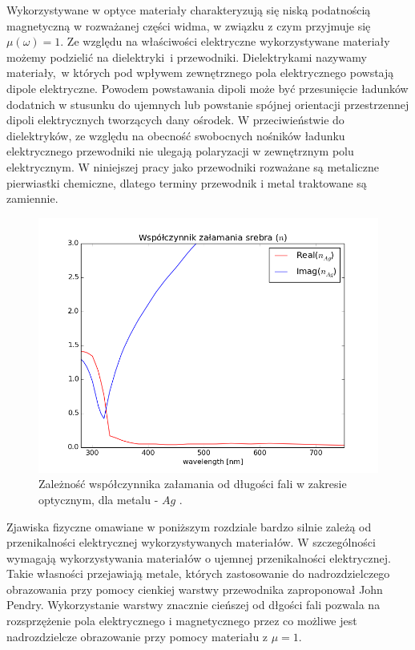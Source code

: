 Wykorzystywane w optyce materiały charakteryzują się niską podatnością magnetyczną w rozważanej części widma, w związku z czym przyjmuje się $\mu(\omega)=1$. Ze względu na właściwości elektryczne wykorzystywane materiały możemy  podzielić na dielektryki~i przewodniki. Dielektrykami nazywamy materiały,~w których pod wpływem zewnętrznego pola elektrycznego powstają dipole elektryczne. Powodem powstawania dipoli może być przesunięcie ładunków dodatnich w stusunku do ujemnych lub powstanie spójnej orientacji przestrzennej dipoli elektrycznych tworzących dany ośrodek. W przeciwieństwie do dielektryków, ze względu na obecność swobocnych nośników ładunku elektrycznego przewodniki nie ulegają polaryzacji w zewnętrznym polu elektrycznym. W niniejszej pracy jako przewodniki rozważane są metaliczne pierwiastki chemiczne, dlatego terminy przewodnik i metal traktowane są zamiennie.

\begin{figure}[tb]
	\includegraphics[width=\textwidth]{images/agn.png}
	\caption{Zależność współczynnika załamania od długości fali w zakresie optycznym, dla metalu - $Ag$ \cite{PhysRevB.6.4370}.  }
	\label{fig:agn}
\end{figure}
Zjawiska fizyczne omawiane w poniższym rozdziale bardzo silnie zależą od przenikalności elektrycznej wykorzystywanych materiałów. W szczególności wymagają wykorzystywania materiałów o ujemnej przenikalności elektrycznej. Takie własności przejawiają metale, których zastosowanie do nadrozdzielczego obrazowania przy pomocy cienkiej warstwy przewodnika zaproponował John Pendry. Wykorzystanie warstwy znacznie cieńszej od dłgości fali pozwala na rozsprzężenie pola elektrycznego i magnetycznego przez co możliwe jest nadrozdzielcze obrazowanie przy pomocy materiału z $\mu=1$. \cite{PhysRevLett.85.396}

